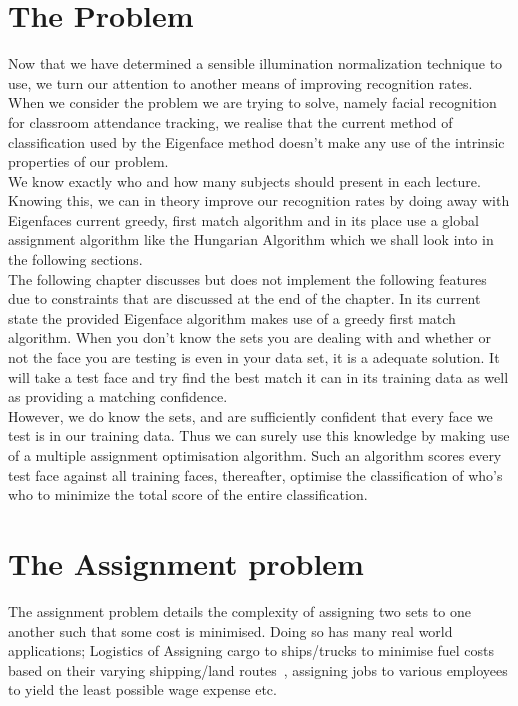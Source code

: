 \section{The Problem}
Now that we have determined a sensible illumination normalization technique to use, we turn our 
attention to another means of improving recognition rates.  When we consider the problem we are
trying to solve, namely facial recognition for classroom attendance tracking, we realise that 
the current method of classification used by the Eigenface method doesn't make any use of the 
intrinsic properties of our problem. \\

We know exactly who and how many subjects should present in each lecture.  Knowing this, we can 
in theory improve our recognition rates by doing away with Eigenfaces current greedy, first match 
algorithm and in its place use a global assignment algorithm like the Hungarian Algorithm which 
we shall look into in the following sections. \\

The following chapter discusses but does not implement the following features due to constraints 
that are discussed at the end of the chapter.  In its current state the provided Eigenface 
algorithm makes use of a greedy first match algorithm.  When you don't know the sets you are dealing 
with and whether or not the face you are testing is even in your data set, it is a adequate solution.  
It will take a test face and try find the best match it can in its training data as well as providing 
a matching confidence.  \\
	
However, we do know the sets, and are sufficiently confident that every face we test is in our training 
data.  Thus we can surely use this knowledge by making use of a multiple assignment optimisation 
algorithm.  Such an algorithm scores every test face against all training faces, thereafter, optimise 
the classification of who's who to minimize the total score of the entire classification.

\section{The Assignment problem}
The assignment problem details the complexity of assigning two sets to one another such that some cost 
is minimised.  Doing so has many real world applications; Logistics of Assigning cargo to ships/trucks 
to minimise fuel costs based on their varying shipping/land routes~\cite{Assignmentproblems}, assigning 
jobs to various employees to yield the least possible wage expense etc. 


